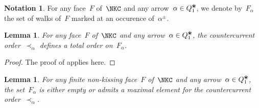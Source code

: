 \documentclass{amsart}
\newtheorem{lemma}[theorem]{Lemma}
\theoremstyle{definition}
\newtheorem{notation}[theorem]{Notation}
\newcommand{\blossom}{^\text{\ding{96}}} %
\begin{document}
\begin{notation}
\label{notation:Falpha}
For any face~$F$ of~$\NKC$ and any arrow~$\alpha\in Q_1\blossom$, we denote by~$F_\alpha$ the set of walks of~$F$ marked at an occurence of~$\alpha^\pm$.
\end{notation}

\begin{lemma}
\label{lemm:countercurrentOrderIsTotal}
For any face~$F$ of~$\NKC$ and any arrow~$\alpha\in Q_1\blossom$, the countercurrent order~$\prec_\alpha$ defines a total order on~$F_{\alpha}$.
\end{lemma}
\begin{proof}
 The proof of \cite[Lem.~2.21]{PaluPilaudPlamondon} applies here.
\end{proof}

\begin{lemma}
\label{lemm:facesHaveMaximalElement}
For any finite non-kissing face~$F$ of~$\NKC$ and any arrow~$\alpha\in Q_1\blossom$, the set~$F_\alpha$ is either empty or admits a maximal element for the countercurrent order~$\prec_\alpha$.
\end{lemma}
\end{document}
